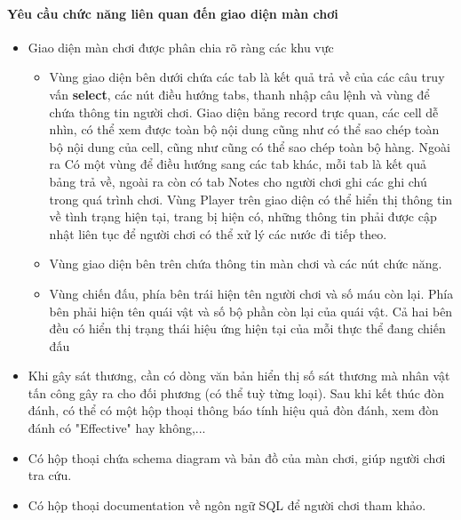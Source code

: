 \paragraph{Yêu cầu chức năng liên quan đến giao diện màn chơi}
\begin{itemize}
		\item Giao diện màn chơi được phân chia rõ ràng các khu vực
		\begin{itemize}
			\item Vùng giao diện bên dưới chứa các tab là kết quả trả về của các câu truy vấn \textbf{select}, các nút điều hướng tabs, thanh nhập câu lệnh và vùng để chứa thông tin người chơi. Giao diện bảng record trực quan, các cell dễ nhìn, có thể xem được toàn bộ nội dung cũng như có thể sao chép toàn bộ nội dung của cell, cũng như cũng có thể sao chép toàn bộ hàng. Ngoài ra Có một vùng để điều hướng sang các tab khác, mỗi tab là kết quả bảng trả về, ngoài ra còn có tab Notes cho người chơi ghi các ghi chú trong quá trình chơi. Vùng Player trên giao diện có thể hiển thị thông tin về tình trạng hiện tại, trang bị hiện có, những thông tin phải được cập nhật liên tục để người chơi có thể xử lý các nước đi tiếp theo.
			\item Vùng giao diện bên trên chứa thông tin màn chơi và các nút chức năng.
			\item Vùng chiến đấu, phía bên trái hiện tên người chơi và số máu còn lại. Phía bên phải hiện tên quái vật và số bộ phần còn lại của quái vật. Cả hai bên đều có hiển thị trạng thái hiệu ứng hiện tại của mỗi thực thể đang chiến đấu
		\end{itemize}
		\item Khi gây sát thương, cần có dòng văn bản hiển thị số sát thương mà nhân vật tấn công gây ra cho đối phương (có thể tuỳ từng loại). Sau khi kết thúc đòn đánh, có thể có một hộp thoại thông báo tính hiệu quả đòn đánh, xem đòn đánh có "Effective" hay không,...
		\item Có hộp thoại chứa schema diagram và bản đồ của màn chơi, giúp người chơi tra cứu.
		\item Có hộp thoại documentation về ngôn ngữ SQL để người chơi tham khảo.
	
\end{itemize}


